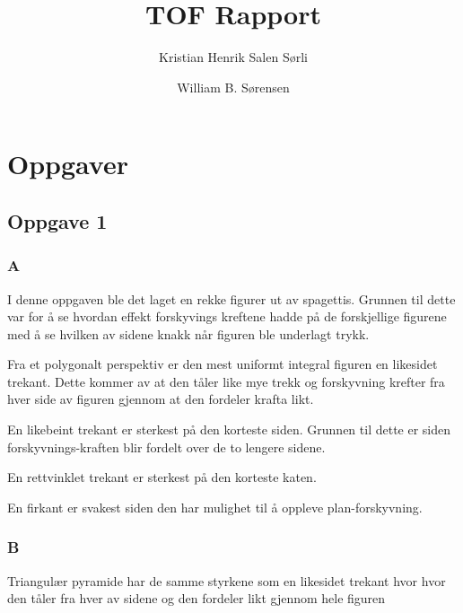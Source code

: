 \documentclass{report}
\author{
  Kristian Henrik Salen Sørli
  \and
  William B. Sørensen\\
}
\title{TOF Rapport}
\begin{document}
\maketitle

\tableofcontents

\chapter{Oppgaver}

\section*{Oppgave 1}

\subsection*{A}

I denne oppgaven ble det laget en rekke figurer ut av spagettis. Grunnen til dette var for å se hvordan effekt forskyvings kreftene hadde på de forskjellige figurene med å se hvilken av sidene knakk når figuren ble underlagt trykk.

Fra et polygonalt perspektiv er den mest uniformt integral figuren en likesidet trekant. Dette kommer av at den tåler like mye trekk og forskyvning krefter fra hver side av figuren gjennom at den fordeler krafta likt.

En likebeint trekant er sterkest på den korteste siden. Grunnen til dette er siden forskyvnings-kraften blir fordelt over de to lengere sidene.

En rettvinklet trekant er sterkest på den korteste katen.

En firkant er svakest siden den har mulighet til å oppleve plan-forskyvning.

\subsection*{B}

Triangulær pyramide har de samme styrkene som en likesidet trekant hvor hvor den tåler fra hver av sidene og den fordeler likt gjennom hele figuren
\end{document}
